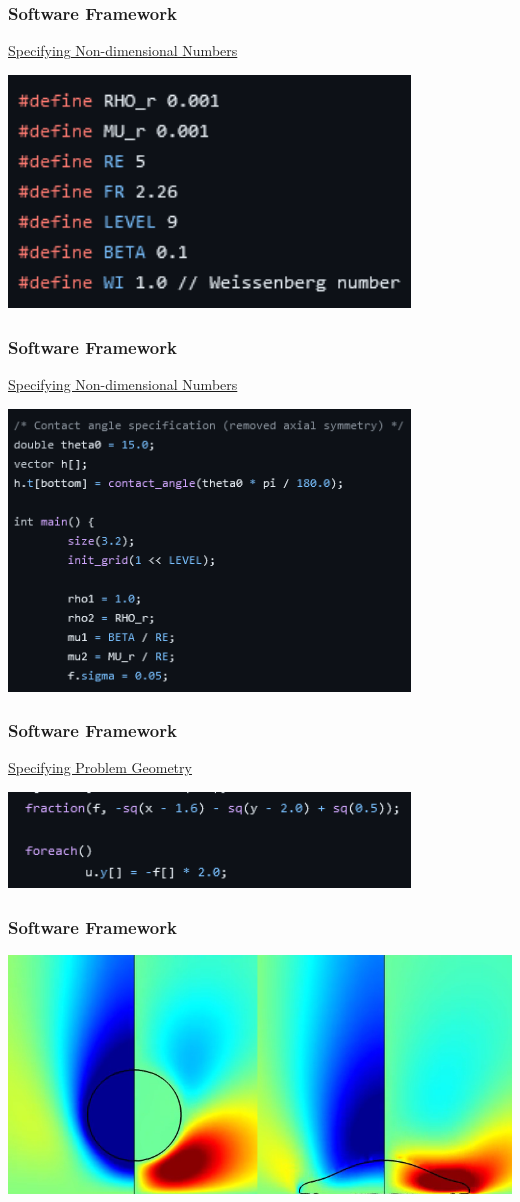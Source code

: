 \documentclass[12pt]{beamer}
\begin{document}
\begin{frame}
    \frametitle{Software Framework}
    \underline{Specifying Non-dimensional Numbers}

    \includegraphics[width=0.8\textwidth]{img/numbers.png}
\end{frame}
\begin{frame}
    \frametitle{Software Framework}
    \underline{Specifying Non-dimensional Numbers}

    \includegraphics[width=0.8\textwidth]{img/more-numbers.png}
\end{frame}
\begin{frame}
    \frametitle{Software Framework}
    \underline{Specifying Problem Geometry}

    \includegraphics[width=0.8\textwidth]{img/geometry.png}
\end{frame}
\begin{frame}
    \frametitle{Software Framework}

    \includegraphics[width=\textwidth]{img/4-drop.png}
\end{frame}
\end{document}
